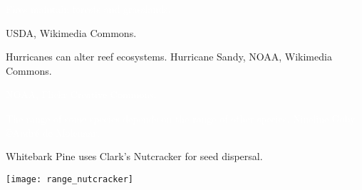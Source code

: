 \documentclass[t]{beamer}
\begin{document}
{
\begin{frame}[b,plain]{}

\end{frame}
}

{
\begin{frame}[b,plain]{}

\end{frame}
}


{
\begin{frame}[b,plain]{\textcolor{white}{Fires maintain forests and grasslands.}}

\end{frame}
}

{
\begin{frame}[b,plain]
	\tiny\hfill USDA, Wikimedia Commons.
\end{frame}
}
{
\begin{frame}[b,plain]{Hurricanes can alter reef ecosystems.}
	\tiny\hfill Hurricane Sandy, NOAA, Wikimedia Commons.
\end{frame}
}

{
\begin{frame}[b,plain]
	\tiny\textcolor{white}{NOAA, Flickr Creative Commons.}
\end{frame}
}

{
\begin{frame}[b,plain]{\textcolor{white}{The range of some species depends on the range of other species.}}
	\tiny\textcolor{white}{Nineline Goby, \copyright André de Molenaar.}
\end{frame}
}

\begin{frame}[t,plain]{Whitebark Pine uses Clark’s Nutcracker for seed dispersal.}
	\begin{center}
		\texttt{[image: range\_nutcracker]}
	\end{center}
\end{frame}
\end{document}
